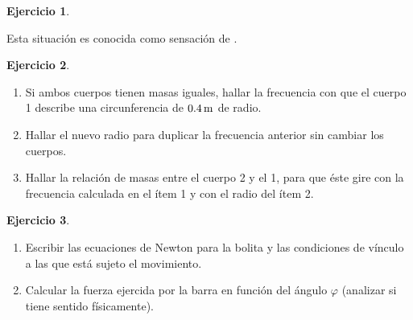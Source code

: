 \documentclass[a4paper,12pt,twoside]{book}
\newtheorem{ejercicio}{{Ejercicio}}[chapter]
\begin{document}
\begin{mdframed}[style=ejercicio-intermedio]
    \begin{ejercicio}
    \end{ejercicio}
    Esta situación es conocida como sensación de .
\end{mdframed}

\begin{mdframed}[style=ejercicio-intermedio]
    \begin{ejercicio}
    \end{ejercicio}
    \begin{center}
        \def\svgwidth{0.7\linewidth}
        
    \end{center}
    \begin{enumerate}
        \item Si ambos cuerpos tienen masas iguales, hallar la frecuencia con que el cuerpo 1 describe una circunferencia de $0.4 \, \si{\metre}$ de radio.
        \item Hallar el nuevo radio para duplicar la frecuencia anterior sin cambiar los cuerpos.
        \item Hallar la relación de masas entre el cuerpo 2 y el 1, para que éste gire con la frecuencia calculada en el ítem 1 y con el radio del ítem 2.
    \end{enumerate}
\end{mdframed}

\begin{mdframed}[style=ejercicio-intermedio]
    \begin{ejercicio}
    \end{ejercicio}
    \begin{enumerate}
        \item Escribir las ecuaciones de Newton para la bolita y las condiciones de vínculo a las que está sujeto el movimiento.
        \item Calcular la fuerza ejercida por la barra en función del ángulo $\varphi$ (analizar si tiene sentido físicamente).
    \end{enumerate}
\end{mdframed}
\end{document}
